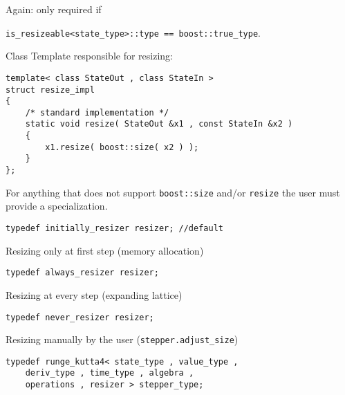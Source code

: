 \begin{frame}[fragile]
Again: only required if \\
\centerline{\lstinline+is_resizeable<state_type>::type == boost::true_type+.}
\vspace{0.5em}

Class Template responsible for resizing:
\begin{lstlisting}
template< class StateOut , class StateIn >
struct resize_impl
{
    /* standard implementation */
    static void resize( StateOut &x1 , const StateIn &x2 )
    {
        x1.resize( boost::size( x2 ) );
    }
};
\end{lstlisting}

For anything that does not support \lstinline+boost::size+ and/or \lstinline+resize+ the user must provide a specialization.

\end{frame}


\begin{frame}[fragile]
\vspace{2ex}

\begin{lstlisting}
typedef initially_resizer resizer; //default
\end{lstlisting}
Resizing only at first step (memory allocation)

\vspace{1ex}
\begin{lstlisting}
typedef always_resizer resizer;
\end{lstlisting}
Resizing at every step (expanding lattice)

\vspace{1ex}
\begin{lstlisting}
typedef never_resizer resizer;
\end{lstlisting}
Resizing manually by the user (\lstinline+stepper.adjust_size+)

\vspace{2ex}
\begin{lstlisting}
typedef runge_kutta4< state_type , value_type , 
    deriv_type , time_type , algebra , 
    operations , resizer > stepper_type; 
\end{lstlisting}


\end{frame}




